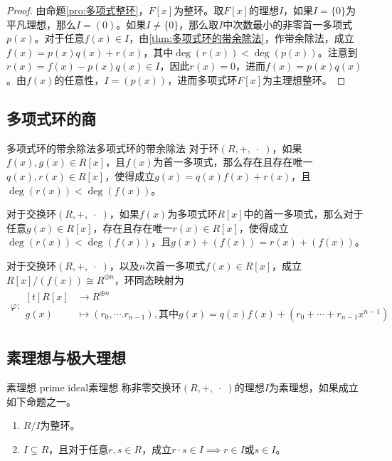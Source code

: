 \begin{proof}
	由命题\ref{pro:多项式整环}，$F[x]$为整环。取$F[x]$的理想$I$，如果$I=\{0\}$为平凡理想，那么$I=(0)$。如果$I\ne\{0\}$，那么取$I$中次数最小的非零首一多项式$p(x)$。对于任意$f(x)\in I$，由\ref{thm:多项式环的带余除法}，作带余除法，成立$f(x)=p(x)q(x)+r(x)$，其中$\deg(r(x))<\deg(p(x))$。注意到$r(x)=f(x)-p(x)q(x)\in I$，因此$r(x)=0$，进而$f(x)=p(x)q(x)$。由$f(x)$的任意性，$I=(p(x))$，进而多项式环$F[x]$为主理想整环。
\end{proof}

\subsection{多项式环的商}

\begin{theorem}{多项式环的带余除法}{多项式环的带余除法}
	对于环$(R,+,\;\cdot\;)$，如果$f(x),g(x)\in R[x]$，且$f(x)$为首一多项式，那么存在且存在唯一$q(x),r(x)\in R[x]$，使得成立$g(x)=q(x)f(x)+r(x)$，且$\deg(r(x))<\deg(f(x))$。
\end{theorem}

\begin{proposition}
	对于交换环$(R,+,\;\cdot\;)$，如果$f(x)$为多项式环$R[x]$中的首一多项式，那么对于任意$g(x)\in R[x]$，存在且存在唯一$r(x)\in R[x]$，使得成立$\deg(r(x))<\deg(f(x))$，且$g(x)+(f(x))=r(x)+(f(x))$。
\end{proposition}

\begin{proposition}
	对于交换环$(R,+,\;\cdot\;)$，以及$n$次首一多项式$f(x)\in R[x]$，成立$R[x]/(f(x))\cong R^{\oplus n}$，环同态映射为
	\begin{align*}
		\varphi:\begin{aligned}[t]
			R[x]&\longrightarrow R^{\oplus n}\\
			g(x)&\longmapsto (r_0,\cdots.r_{n-1}),\text{其中}g(x)=q(x)f(x)+(r_0+\cdots+r_{n-1}x^{n-1})
		\end{aligned}
	\end{align*}
\end{proposition}

\subsection{素理想与极大理想}

\begin{definition}{素理想 prime ideal}{素理想}
	称非零交换环$(R,+,\;\cdot\;)$的理想$I$为素理想，如果成立如下命题之一。
	\begin{enumerate}
		\item $R/I$为整环。
		\item $I\subsetneq R$，且对于任意$r,s\in R$，成立$r\cdot s\in I\implies r\in I\text{或}s\in I$。
	\end{enumerate}
\end{definition}


